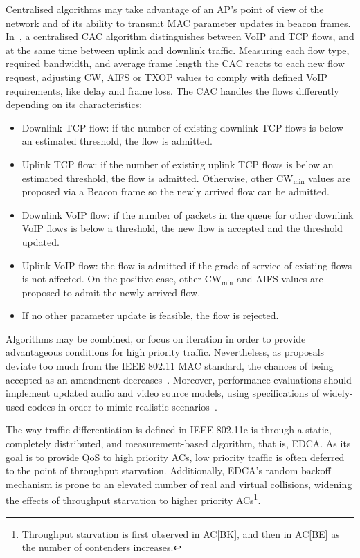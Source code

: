 \documentclass[a4paper]{article}
\begin{document}
Centralised algorithms may take advantage of an AP's point of view of the network and of its ability to transmit MAC parameter updates in beacon frames. In~\cite{bellalta290call}, a centralised CAC algorithm distinguishes between VoIP and TCP flows, and at the same time between uplink and downlink traffic. Measuring each flow type, required bandwidth, and average frame length the CAC reacts to each new flow request, adjusting CW, AIFS or TXOP values to comply with defined VoIP requirements, like delay and frame loss. The CAC handles the flows differently depending on its characteristics:
	\begin{itemize}
		\item Downlink TCP flow: if the number of existing downlink TCP flows is below an estimated threshold, the flow is admitted.
		\item Uplink TCP flow: if the number of existing uplink TCP flows is below an estimated threshold, the flow is admitted. Otherwise, other CW$_{\min}$ values are proposed via a Beacon frame so the newly arrived flow can be admitted.
		\item Downlink VoIP flow: if the number of packets in the queue for other downlink VoIP flows is below a threshold, the new flow is accepted and the threshold updated.
		\item Uplink VoIP flow: the flow is admitted if the grade of service of existing flows is not affected. On the positive case, other CW$_{\min}$ and AIFS values are proposed to admit the newly arrived flow.
		\item If no other parameter update is feasible, the flow is rejected.
	\end{itemize}

Algorithms may be combined, or focus on iteration in order to provide advantageous conditions for high priority traffic. Nevertheless, as proposals deviate too much from the IEEE 802.11 MAC standard, the chances of being accepted as an amendment decreases~\cite{WMP,perahia2008ieee}. Moreover, performance evaluations should implement updated audio and video source models, using specifications of widely-used codecs in order to mimic realistic scenarios~\cite{van2008traffic,menth2009source}.

The way traffic differentiation is defined in IEEE 802.11e is through a static, completely distributed, and measurement-based algorithm, that is, EDCA. As its goal is to provide QoS to high priority ACs, low priority traffic is often deferred to the point of throughput starvation. Additionally, EDCA's random backoff mechanism is prone to an elevated number of real and virtual collisions, widening the effects of throughput starvation to higher priority ACs\footnote{Throughput starvation is first observed in AC[BK], and then in AC[BE] as the number of contenders increases.}. 
\end{document}
